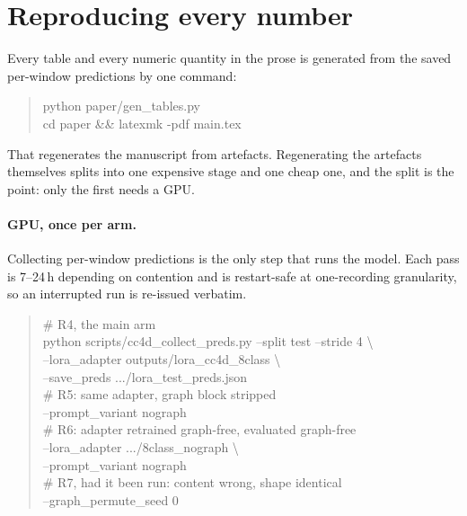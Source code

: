 \documentclass[10pt,twocolumn]{article}
\begin{document}
\section{Reproducing every number}
\label{app:repro}

Every table and every numeric quantity in the prose is generated from the saved
per-window predictions by one command:

\begin{quote}\scriptsize\ttfamily\raggedright
python paper/gen\_tables.py\\
cd paper \&\& latexmk -pdf main.tex
\end{quote}

That regenerates the manuscript from artefacts. Regenerating the artefacts
themselves splits into one expensive stage and one cheap one, and the split is
the point: only the first needs a GPU.

\paragraph{GPU, once per arm.} Collecting per-window predictions is the only
step that runs the model. Each pass is 7--24\,h depending on contention and is
restart-safe at one-recording granularity, so an interrupted run is re-issued
verbatim.

\begin{quote}\scriptsize\ttfamily\raggedright
\# R4, the main arm\\
python scripts/cc4d\_collect\_preds.py --split test --stride 4 \textbackslash\\
\hspace*{1em}--lora\_adapter outputs/lora\_cc4d\_8class \textbackslash\\
\hspace*{1em}--save\_preds .../lora\_test\_preds.json\\[3pt]
\# R5: same adapter, graph block stripped\\
\hspace*{1em}--prompt\_variant nograph\\[3pt]
\# R6: adapter retrained graph-free, evaluated graph-free\\
\hspace*{1em}--lora\_adapter .../8class\_nograph \textbackslash\\
\hspace*{1em}--prompt\_variant nograph\\[3pt]
\# R7, had it been run: content wrong, shape identical\\
\hspace*{1em}--graph\_permute\_seed 0
\end{quote}
\end{document}
